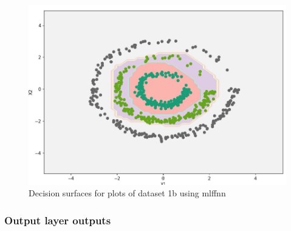 \documentclass[11pt]{article}
\begin{document}
\begin{figure}
\centering
\includegraphics[scale=0.25]{dataset1b_mlffnn_ds.jpg}
\caption{Decision surfaces for plots of dataset 1b using mlffnn}
\label{fig:fig2.1.2}
\end{figure}

\newpage
\subsubsection{Output layer outputs}
 
\end{document}
